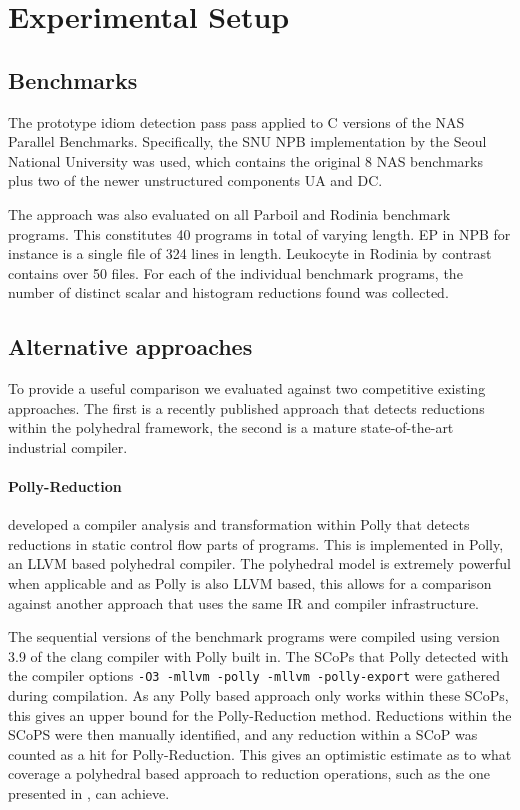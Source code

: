 \section{Experimental Setup}

\subsection{Benchmarks}

    The prototype idiom detection pass pass applied to C versions of the
    NAS Parallel Benchmarks.
    Specifically, the SNU NPB implementation by the Seoul National University
    was used, which contains the original 8 NAS benchmarks plus two of the newer
    unstructured components UA and DC.

    The approach was also evaluated on all Parboil and Rodinia benchmark
    programs.
    This constitutes 40 programs in total of varying length.
    EP in NPB for instance is a single file of 324 lines in length.
    Leukocyte in Rodinia by contrast contains over 50 files.
    For each of the individual benchmark programs, the number of distinct scalar
    and histogram reductions found was collected.

\subsection{Alternative approaches}

    To provide a useful comparison we evaluated against two competitive
    existing approaches. The first is a  recently published approach that
    detects reductions within the polyhedral framework, the second is a mature
    state-of-the-art industrial compiler.

\paragraph*{Polly-Reduction}

    \citet{Doerfert2015Polly} developed a compiler analysis and transformation
    within Polly that detects reductions in static control flow parts of
    programs.
    This is implemented in Polly, an LLVM based polyhedral compiler.
    The polyhedral model is extremely powerful when applicable and as Polly is
    also LLVM based, this allows for a comparison against another approach that
    uses the same IR and compiler infrastructure.

    The sequential versions of the benchmark programs were compiled using
    version 3.9 of the clang compiler with Polly built in.
    The SCoPs that Polly detected with the compiler options \texttt{-O3
    -mllvm -polly -mllvm -polly-export} were gathered during compilation.
    As any Polly based approach only works within these SCoPs, this gives an
    upper bound for the Polly-Reduction method.
    Reductions within the SCoPS were then manually identified, and any reduction
    within a SCoP was counted as a hit for Polly-Reduction.
    This gives an optimistic estimate as to what coverage a polyhedral based
    approach to reduction operations, such as the one presented in
    \citet{Doerfert2015Polly}, can achieve.


